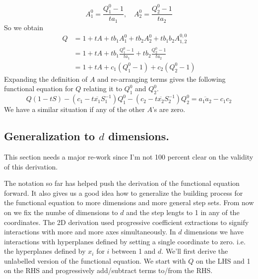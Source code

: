 \documentclass[12pt]{article}
\theoremstyle{definition} \newtheorem{definition}[theorem]{Definition}
\newcommand{\ol}[1]{\overline{#1}}
\newcommand{\aye}[2]{A_{#1}^{#2}}
\begin{document}
\[
	A_1^0 = \frac{Q_1^0-1}{ta_1},\quad    A_2^0 = \frac{Q_2^0-1}{ta_2}
\]
So we obtain
\begin{align*}
	Q &= 1+ tA + tb_1A_1^0+tb_2 A_2^0 + tb_1b_2 \aye{1,2}{0,0}\\
	    &= 1+ t A + tb_1\frac{Q_1^0-1}{ta_1}+ tb_2\frac{Q_2^0-1}{ta_2}\\
	    &= 1+ tA + c_1(Q_1^0-1)+c_2(Q_2^0-1)
\end{align*}
Expanding the definition of $A$ and re-arranging terms gives the following functional equation for $Q$ relating it to $Q_1^0$ and $Q_2^0$.
\[
	 Q(1-tS) - (c_1-t\ol{x_1}S_1^{-1})Q_1^0 - (c_2-t\ol{x_2}S_2^{-1})Q_2^0 = \ol{a_1 a_2} - c_1c_2
\]
We have a similar situation if any of the other $A$'s are zero.
\subsection{Generalization to $d$ dimensions.}

This section needs a major re-work since I'm not 100 percent clear on the validity of this derivation.

The notation so far has helped push the derivation of the functional equation forward. It also gives us a good idea how to generalize the building process for the functional equation to more dimensions and more general step sets. From now on we fix the numbe of dimensions to $d$ and the step lengts to 1 in any of the coordinates. The 2D derivation used progressive coefficient extractions to signify interactions with more and more axes simultaneously. In $d$ dimensions we have interactions with hyperplanes defined by setting a single coordinate to zero. i.e. the hyperplanes defined by $x_i$ for $i$ between 1 and $d$. We'll first derive the unlabelled version of the functional equation. We start with $Q$ on the LHS and 1 on the RHS and progressively add/subtract terms to/from the RHS.
\end{document}
